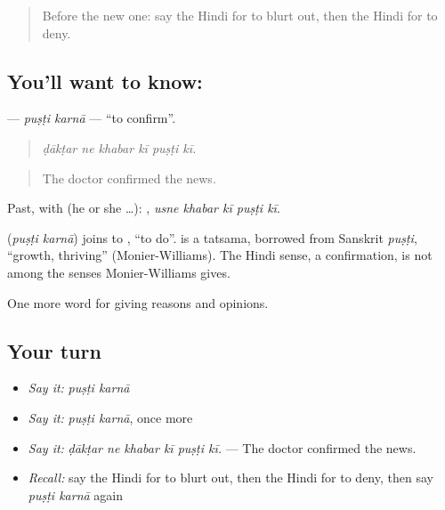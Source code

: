 \label{lesson:HI-C349-pustikarna}



\begin{quote}
Before the new one: say the Hindi for to blurt out, then the Hindi for to deny.
\end{quote}

\subsection*{You'll want to know:  }
\textbf{ } — \emph{puṣṭi karnā} — \textquotedblleft{}to confirm\textquotedblright{}.

\begin{quote}
     
\end{quote}

\begin{quote}
\emph{ḍākṭar ne khabar kī puṣṭi kī.}
\end{quote}

\begin{quote}
The doctor confirmed the news.
\end{quote}

Past, with  (he or she …):     , \emph{usne khabar kī puṣṭi kī}.

\begin{cousinweb}
\textbf{ } (\emph{puṣṭi karnā}) joins  to , \textquotedblleft{}to do\textquotedblright{}.  is a tatsama, borrowed from Sanskrit \emph{puṣṭi}, \textquotedblleft{}growth, thriving\textquotedblright{} (Monier-Williams). The Hindi sense, a confirmation, is not among the senses Monier-Williams gives.
\end{cousinweb}

\begin{grammarlens}[title={What you've built}]
One more word for giving reasons and opinions.
\end{grammarlens}

\subsection*{Your turn}
\begin{itemize}
\raggedright
  \item \emph{Say it:} \emph{puṣṭi karnā}
  \item \emph{Say it:} \emph{puṣṭi karnā}, once more
  \item \emph{Say it:} \emph{ḍākṭar ne khabar kī puṣṭi kī.} — The doctor confirmed the news.
  \item \emph{Recall:} say the Hindi for to blurt out, then the Hindi for to deny, then say \emph{puṣṭi karnā} again
\end{itemize}

